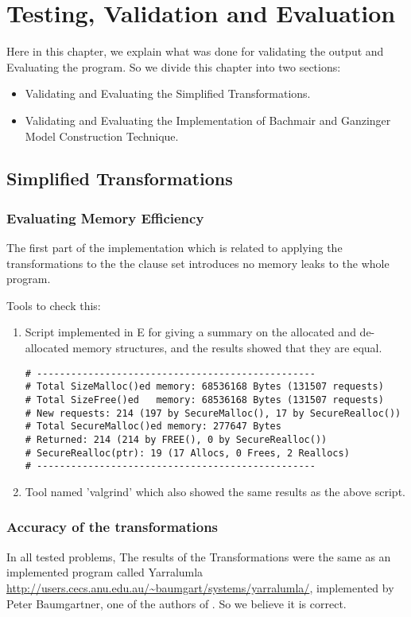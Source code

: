 \chapter{Testing, Validation and Evaluation}\label{chap:test_and_val}
Here in this chapter, we explain what was done for validating the output and Evaluating the program. So we divide this chapter into two sections:
\begin{itemize}
	\item Validating and Evaluating the Simplified Transformations.
	\item Validating and Evaluating the Implementation of Bachmair and Ganzinger Model Construction Technique.
\end{itemize} 

\section{Simplified Transformations}

\subsection{Evaluating Memory Efficiency}\label{sub:val_tran_mem}
The first part of the implementation which is related to applying the transformations to the the clause set introduces no memory leaks to the whole program.


Tools to check this:
\begin{enumerate}
	\item Script implemented in E for giving a summary on the allocated and de-allocated memory structures, and the results showed that they are equal.
		\begin{lstlisting}
# -------------------------------------------------
# Total SizeMalloc()ed memory: 68536168 Bytes (131507 requests)
# Total SizeFree()ed   memory: 68536168 Bytes (131507 requests)
# New requests: 214 (197 by SecureMalloc(), 17 by SecureRealloc())
# Total SecureMalloc()ed memory: 277647 Bytes
# Returned: 214 (214 by FREE(), 0 by SecureRealloc())
# SecureRealloc(ptr): 19 (17 Allocs, 0 Frees, 2 Reallocs)
# -------------------------------------------------
		\end{lstlisting}
	\item Tool named 'valgrind' which also showed the same results as the above script.
\end{enumerate}


\subsection{Accuracy of the transformations}
In all tested problems, The results of the Transformations were the same as an implemented program called Yarralumla \url{http://users.cecs.anu.edu.au/~baumgart/systems/yarralumla/}, implemented by Peter Baumgartner, one of the authors of \cite{BMUG06}. So we believe it is correct.

